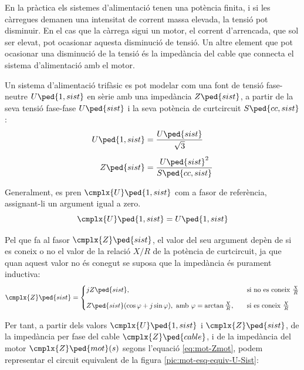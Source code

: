 En la pràctica els sistemes d'alimentació tenen una potència finita, i si les càrregues demanen una intensitat de corrent massa elevada, la tensió pot disminuir. En el cas que la càrrega sigui un motor, el corrent d'arrencada, que sol ser elevat, pot ocasionar aquesta disminució de tensió. Un altre element que pot ocasionar una disminució de la tensió és la impedància del cable que connecta el sistema d'alimentació amb el motor.

Un sistema d'alimentació trifàsic es pot modelar com una font de tensió fase-neutre $U\ped{1,sist}$ en sèrie amb una impedància $Z\ped{sist}$, a partir de la seva tensió fase-fase $U\ped{sist}$ i la seva potència de curtcircuit $S\ped{cc,sist}$:
\begin{align}
	U\ped{1,sist} &= \frac{U\ped{sist}}{\sqrt{3}} \\[1ex]
	Z\ped{sist} &= \frac{U\ped{sist}^2}{S\ped{cc,sist}}
\end{align}

Generalment, es pren $\cmplx{U}\ped{1,sist}$ com a fasor de referència, assignant-li un argument igual a zero. 
\begin{equation}
	\cmplx{U}\ped{1,sist} = U\ped{1,sist}
\end{equation}

Pel que fa al fasor  $\cmplx{Z}\ped{sist}$, el valor del seu argument depèn de si es coneix o no el valor de la relació $X/R$ de la potència de curtcircuit, ja que quan aquest valor no és conegut se suposa que la impedància és purament inductiva:
\begin{equation}
	\cmplx{Z}\ped{sist} = 
	\begin{cases}
		j Z\ped{sist},  & \quad\text{si no es coneix }\frac{X}{R}  \\[2ex]
		Z\ped{sist} (\cos\varphi+j\sin\varphi), \text{ amb } \varphi=\arctan\frac{X}{R}, & \quad\text{si es coneix } \frac{X}{R} 
	\end{cases}
\end{equation}

Per tant, a partir dels valors $\cmplx{U}\ped{1,sist}$ i $\cmplx{Z}\ped{sist}$, de la impedància per fase del cable $\cmplx{Z}\ped{cable}$, i de la impedància del motor $\cmplx{Z}\ped{mot}(s)$ segons l'equació \eqref{eq:mot-Zmot}, podem representar el circuit equivalent de la figura \vref{pic:mot-esq-equiv-U-Sist}:

\begin{center}
	
	\label{pic:mot-esq-equiv-U-Sist}
\end{center}

